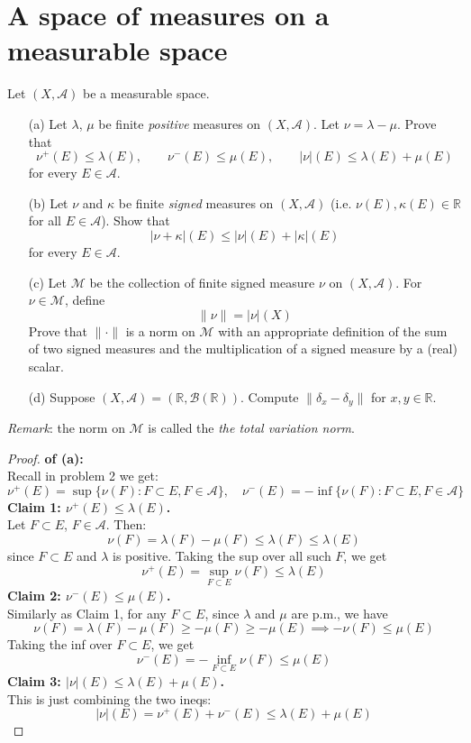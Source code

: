 \documentclass[lang=cn,11pt]{elegantbook}
\begin{document}
\section{A space of measures on a measurable space}
  Let $(X, \mathcal{A})$ be a measurable space. 
  \begin{itemize}
  \item[(a)]Let $\lambda$, $\mu$ be finite \emph{positive} measures on $(X, \mathcal{A})$. 
    Let $\nu=\lambda-\mu$. Prove that   \begin{equation*}
      \nu^+(E)\le \lambda(E), \qquad \nu^-(E)\le \mu(E), \qquad |\nu|(E)\le \lambda(E)+\mu(E)
  \end{equation*}
  for every $E\in \mathcal{A}$.
\item[(b)]Let $\nu$ and $\kappa$ be finite \emph{signed} measures on $(X, \mathcal{A})$ (i.e.  $\nu(E),\kappa(E)\in\mathbb{R}$ for all $E\in\mathcal{A}$).  Show that 
\[
  |\nu+\kappa|(E) \le |\nu|(E)+|\kappa|(E) 
\]
for every $E\in \mathcal{A}$. 
\item[(c)] Let $\mathcal{M}$ be the collection of finite signed measure $\nu$ on $(X,\mathcal{A})$. 
  For $\nu\in \mathcal{M}$, define   \[
    \| \nu\|= |\nu|(X)
  \]
  Prove that $\|\cdot\|$ is a norm on $\mathcal{M}$ with an appropriate definition of the sum of two signed measures and the multiplication of a signed measure by a (real) scalar. 
\item[(d)] Suppose $(X,\mathcal{A})=(\mathbb{R},\mathcal{B}(\mathbb{R}))$. Compute $\|\delta_x-\delta_y\|$ for $x,y\in\mathbb{R}$.
\end{itemize}

\textit{Remark}: the norm on $\mathcal{M}$ is called the \emph{the total variation norm}.


\begin{proof}
    \textbf{of (a):}\\
Recall in problem 2 we get:
\[
\nu^+(E) = \sup\{ \nu(F) : F \subset E, F \in \mathcal{A} \}, \quad 
\nu^-(E) = -\inf\{ \nu(F) : F \subset E, F \in \mathcal{A} \}
\]
\textbf{Claim 1: $\nu^+(E)\le \lambda(E)$.}\\
Let \(F \subset E\), \(F \in \mathcal{A}\). Then:
\[
\nu(F) = \lambda(F) - \mu(F) \le \lambda(F) \le \lambda(E)
\]
since \(F \subset E\) and \(\lambda\) is positive.  
Taking the sup over all such \(F\), we get
\[
\nu^+(E) = \sup_{F \subset E} \nu(F) \le \lambda(E)
\]\textbf{Claim 2: $ \nu^-(E)\le \mu(E)$.}\\
Similarly as Claim 1, for any \(F \subset E\), since $\lambda$ and $\mu$ are p.m., we have
\[
\nu(F) = \lambda(F) - \mu(F) \ge -\mu(F) \ge -\mu(E)
\implies -\nu(F) \le \mu(E)
\]
Taking the inf over $F \subset E$, we get
\[
\nu^-(E) = -\inf_{F \subset E} \nu(F) \le \mu(E)
\]
\textbf{Claim 3: $|\nu|(E)\le \lambda(E)+\mu(E)$.}\\
This is just combining the two ineqs:  \[
|\nu|(E) = \nu^+(E) + \nu^-(E) \le \lambda(E) + \mu(E)
\]
\end{proof}
\end{document}
